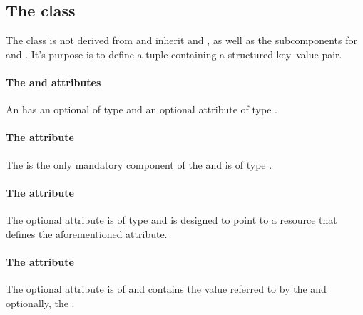 \subsection{The \FBC {} class}
\label{keyvalue-class}

The \FBC \KeyValue class is not derived from \SBML \SBase and  inherit
 and , as well as the subcomponents for
\Annotation and \Notes. It's purpose is to define a tuple containing a
structured key--value pair.

\paragraph{The  and  attributes}
An \UserConstraint has an optional  of type
 and an optional attribute  of type .

\paragraph{The  attribute}
The  is the only mandatory component of the \KeyValue and is of type .

\paragraph{The  attribute}
The optional attribute  is of type  and is designed to point to a resource that defines the aforementioned  attribute.

\paragraph{The  attribute}
The optional  attribute is of  and contains the value referred to by the  and optionally, the . 